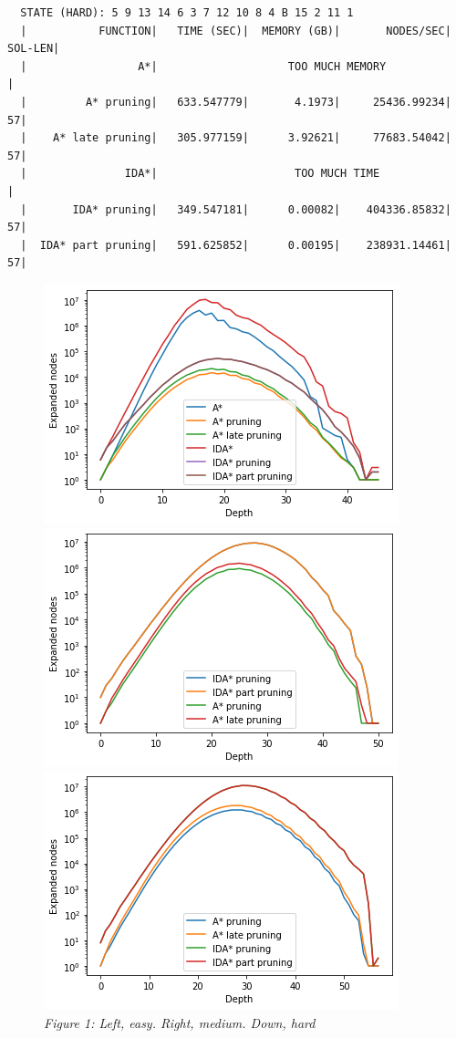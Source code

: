 \documentclass[a4paper,10pt]{article}
\begin{document}
  \begin{verbatim}  
  STATE (HARD): 5 9 13 14 6 3 7 12 10 8 4 B 15 2 11 1                                                                                     
  |           FUNCTION|   TIME (SEC)|  MEMORY (GB)|       NODES/SEC|    SOL-LEN|
  |                 A*|                    TOO MUCH MEMORY                     |  
  |         A* pruning|   633.547779|       4.1973|     25436.99234|         57|
  |    A* late pruning|   305.977159|      3.92621|     77683.54042|         57|
  |               IDA*|                     TOO MUCH TIME                      |
  |       IDA* pruning|   349.547181|      0.00082|    404336.85832|         57|
  |  IDA* part pruning|   591.625852|      0.00195|    238931.14461|         57|
    \end{verbatim}

  \begin{figure}[h!]
    \centering
    \includegraphics[scale=0.6]{15puzzle_easy.png}
    \includegraphics[scale=0.6]{15puzzle_medium.png}
    \includegraphics[scale=0.6]{15puzzle_hard.png}
    \\
    \small{\textit{Figure 1: Left, easy. Right, medium. Down, hard}}
  \end{figure}  
\end{document}
